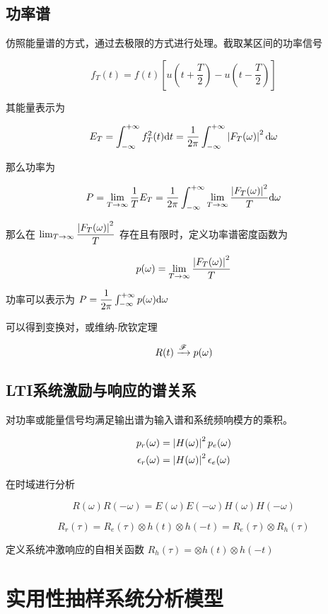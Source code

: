 \documentclass[cn,11pt,chinese,black,simple]{../elegantbook}
\begin{document}
\subsection{功率谱}

仿照能量谱的方式，通过去极限的方式进行处理。截取某区间的功率信号

\[f_T(t) = f(t) \left[u(t+\dfrac{T}{2}) - u(t - \dfrac{T}{2})\right]\]

其能量表示为

\[E_T = \int_{-\infty}^{+\infty} f_T^2(t) \mathrm{d}t = \dfrac{1}{2 \pi} \int_{-\infty}^{+\infty} \left| F_T(\omega) \right|^2 \mathrm{d}\omega\]

那么功率为 

\[P = \lim_{T\rightarrow \infty} \dfrac{1}{T} E_T = \dfrac{1}{2\pi}\int_{-\infty}^{+\infty}  \lim_{T\rightarrow \infty} \dfrac{\left| F_T(\omega) \right|^2}{T} \mathrm{d}\omega\]

那么在 \(\lim_{T\rightarrow \infty}\dfrac{\left| F_T(\omega) \right|^2}{T}\) 存在且有限时，定义功率谱密度函数为

\[p(\omega) = \lim_{T\rightarrow \infty} \dfrac{\left| F_T(\omega) \right|^2}{T}\]

功率可以表示为 \(P = \dfrac{1}{2\pi}\int_{-\infty}^{+\infty} p(\omega) \mathrm{d}\omega\)

可以得到变换对，或维纳-欣钦定理

\[R(t) \xrightarrow{\mathscr{F}} p(\omega)\]

\subsection{LTI系统激励与响应的谱关系}

对功率或能量信号均满足输出谱为输入谱和系统频响模方的乘积。

\begin{equation*}
    \begin{aligned}
        p_r(\omega) &= \left| H(\omega) \right|^2 p_e(\omega) \\
        \epsilon_r(\omega) &= \left| H(\omega) \right|^2 \epsilon_e(\omega) 
    \end{aligned}
\end{equation*}

在时域进行分析

\[R(\omega)R(-\omega) = E(\omega)E(-\omega)H(\omega)H(-\omega)\]

\[R_r(\tau) = R_e(\tau) \otimes h(t) \otimes h(-t) = R_e(\tau) \otimes R_h(\tau)\]

定义系统冲激响应的自相关函数 \(R_h(\tau) = \otimes h(t) \otimes h(-t)\)

\section{实用性抽样系统分析模型}
\end{document}
